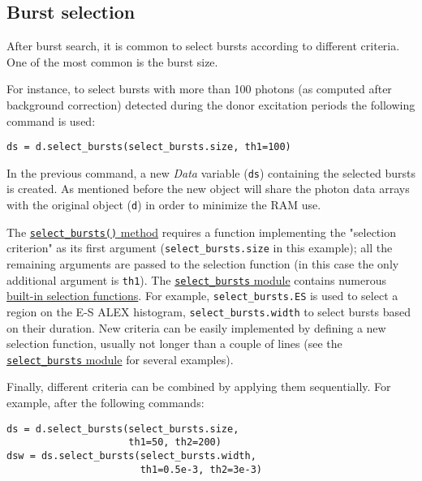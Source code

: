 \subsection{Burst selection}
\label{sec:burstsel}

After burst search, it is common to select bursts according to different
criteria. One of the most common is the burst size.

For instance, to select bursts with more than 100 photons (as computed
after background correction) detected during the donor excitation periods
the following command is used:

\begin{verbatim}
ds = d.select_bursts(select_bursts.size, th1=100)
\end{verbatim}

In the previous command, a new \textit{Data} variable (\verb|ds|) containing
the selected bursts is created.
As mentioned before the new object will share the photon data
arrays with the original object (\verb|d|) in order to minimize the RAM use.

The
\href{http://fretbursts.readthedocs.org/en/latest/data_class.html#burst-selection-methods}{\texttt{select\_bursts()} method}
requires a function implementing the "selection criterion" as its first argument
(\verb|select_bursts.size| in this example);
all the remaining arguments are passed to the selection function (in this case
the only additional argument is \verb|th1|).
The \href{http://fretbursts.readthedocs.org/en/latest/burst_selection.html}{\texttt{select\_bursts} module}
contains numerous
\href{http://fretbursts.readthedocs.org/en/latest/burst_selection.html#module-fretbursts.select_bursts}{built-in selection functions}.
For example,
\verb|select_bursts.ES|
is used to select a region on the E-S ALEX histogram,
\verb|select_bursts.width|
to select bursts based on their duration.
New criteria can be easily implemented by defining a new selection function,
usually not longer than a couple of lines (see the
\href{https://github.com/tritemio/FRETBursts/blob/master/fretbursts/select\_bursts.py}{\texttt{select\_bursts} module} for several examples).

Finally, different criteria can be combined by applying them sequentially.
For example, after the following commands:

\begin{verbatim}
ds = d.select_bursts(select_bursts.size,
                     th1=50, th2=200)
dsw = ds.select_bursts(select_bursts.width,
                       th1=0.5e-3, th2=3e-3)
\end{verbatim}

